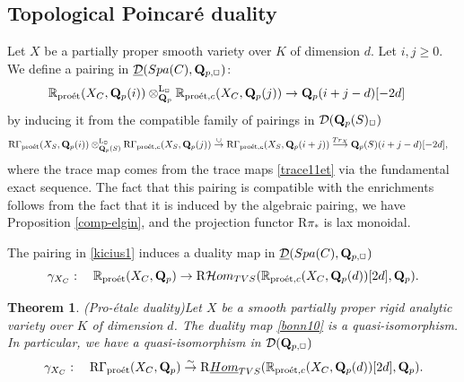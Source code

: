 \documentclass[10pt,reqno]{amsart}
\let\cal\mathcal
\newtheorem{theorem}[equation]{Theorem}
\theoremstyle{definition}
\theoremstyle{remark}
\newcommand{\proeet}{\operatorname{pro\acute{e}t} }
\newcommand{\uHom}{\underline{{\rm{Hom}} }}
\newcommand{\Hhom}{{\cal Hom}}
\newcommand{\LL}{\operatorname{L} }
\newcommand{\sd}{{\mathcal{D}}}
\numberwithin{equation}{section}
\def\R{{\mathrm R}}
\def\Q{{\bf Q}} \def\Z{{\bf Z}}
\numberwithin{equation}{section}
\begin{document}
\subsection{Topological Poincar\'e duality} 
Let $X$ be a partially proper smooth  variety over $K$ of dimension $d$.
Let $i, j\geq 0$.  We define  a pairing in $\underline{\sd}({\rm Spa}(C),\Q_{p,\Box})$: 
\begin{align}\label{kicius1}
 & {\mathbb R}_{\proeet}(X_C,\Q_p(i))\otimes^{\LL_{\Box}}_{\Q_p} {\mathbb R}_{\proeet,c}(X_C,\Q_p(j))\to \Q_p(i+j-d)[-2d]
\end{align}
by inducing it from   the compatible family of pairings in $\sd(\Q_p(S)_{\Box})$
\begin{align*}
 & \R\Gamma_{\proeet}(X_{S},\Q_p(i))\otimes^{\LL_{\Box}}_{\Q_p(S)} \R\Gamma_{\proeet,c}(X_{S},\Q_p(j))  \stackrel{\cup}{\to }\R\Gamma_{\proeet,c}(X_{S},\Q_p(i+j))\stackrel{{\rm Tr}_X}{\longrightarrow} {\Q}_p(S)(i+j-d)[-2d],
 \end{align*}
 where the trace map comes  from the trace maps \eqref{trace11et} via the fundamental exact sequence. 
 The fact that this pairing is compatible with the enrichments follows from the fact that it is induced by the algebraic pairing, we have Proposition \ref{comp-elgin},  and the projection functor $\R\pi_*$ is lax monoidal. 


 The pairing in \eqref{kicius1}  induces a duality map in 
 $\underline{\sd}({\rm Spa}(C),\Q_{p,\Box})$
\begin{equation}\label{bonn10}
\gamma_{X_C}:\quad {\mathbb R}_{\proeet}(X_C,\Q_p)\to \R\Hhom_{\rm TVS}({\mathbb R}_{\proeet,c}(X_C,\Q_p(d))[2d],{\Q}_p).
\end{equation}

  
\begin{theorem}{\rm (Pro-\'etale  duality)}\label{VS-duality}
 Let $X$ be a smooth partially proper  rigid analytic variety over $K$ of dimension $d$.  The duality map
\eqref{bonn10} is a quasi-isomorphism. In particular,
we have a quasi-isomorphism in $\sd(\Q_{p,\Box})$
$$\gamma_{X_C}:\quad{\R}\Gamma_{\proeet}(X_C,\Q_p)\stackrel{\sim}{\to}\R\uHom_{\rm TVS}({\mathbb R}_{\proeet,c}(X_C,\Q_p(d))[2d],\Q_p).
$$
\end{theorem}
\end{document}
